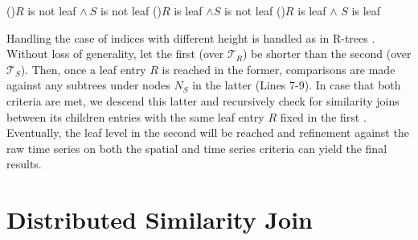 \begin{algorithm}[!ht]
\begin{small}
  \DontPrintSemicolon
  \BlankLine
  \uIf(){$R$ is not leaf $\land \ S$ is not leaf}{
  }
  \uElseIf(){$R$ is leaf $\land S$ is not leaf}{
  }
  \uElseIf(){$R$ is leaf $\land$ $S$ is leaf }{
  }
  \caption{$SimJoinBTSR(R, S, \epsilon_{sp}, \epsilon_{ts})$}
  \label{alg:sim_joins_btsr}
\end{small}
\end{algorithm}

Handling the case of \btsr indices with different height is handled as in R-trees \cite{DBLP:conf/sigmod/BrinkhoffKS93}. Without loss of generality, let the first \btsr (over $\mathcal{T}_{R}$) be shorter than the second \btsr (over $\mathcal{T}_{S}$). Then, once a leaf entry $R$ is reached in the former, comparisons are made against any subtrees under nodes $N_S$ in the latter (Lines 7-9). In case that both criteria are met, we descend this latter \btsr and recursively check for similarity joins between its children entries with the same leaf entry $R$ fixed in the first \btsr. Eventually, the leaf level in the second \btsr will be reached and refinement against the raw time series on both the spatial and time series criteria can yield the final results.  

\section{Distributed Similarity Join}
\label{sec:distributed}

